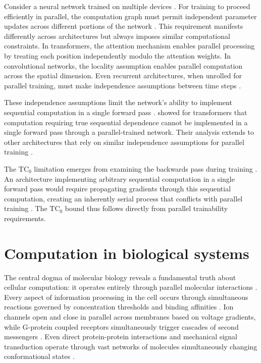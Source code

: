 \documentclass[12pt]{article}
\begin{document}
Consider a neural network trained on multiple devices \cite{zhao2024epha}.
For training to proceed efficiently in parallel, the computation graph must permit independent parameter updates across different portions of the network \cite{barrett2019analyzing}.
This requirement manifests differently across architectures but always imposes similar computational constraints.
In transformers, the attention mechanism enables parallel processing by treating each position independently modulo the attention weights.
In convolutional networks, the locality assumption enables parallel computation across the spatial dimension.
Even recurrent architectures, when unrolled for parallel training, must make independence assumptions between time steps \cite{dickson2023rnns}.

These independence assumptions limit the network's ability to implement sequential computation in a single forward pass \cite{wei2022chain}.
\cite{merrill2023parallelism} showed for transformers that computation requiring true sequential dependence cannot be implemented in a single forward pass through a parallel-trained network.
Their analysis extends to other architectures that rely on similar independence assumptions for parallel training \cite{stillman2023generative}.

The $\text{TC}_0$ limitation emerges from examining the backwards pass during training \cite{jung2020new}.
An architecture implementing arbitrary sequential computation in a single forward pass would require propagating gradients through this sequential computation, creating an inherently serial process that conflicts with parallel training \cite{zhu2024overcoming}.
The $\text{TC}_0$ bound thus follows directly from parallel trainability requirements.

\section{Computation in biological systems}

The central dogma of molecular biology reveals a fundamental truth about cellular computation: it operates entirely through parallel molecular interactions \cite{wang2023parallel,cai2024efficient,fu2023scgrn}.
Every aspect of information processing in the cell occurs through simultaneous reactions governed by concentration thresholds and binding affinities \cite{alberts2022molecular}.
Ion channels open and close in parallel across membranes based on voltage gradients, while G-protein coupled receptors simultaneously trigger cascades of second messengers \cite{alberts2022molecular}.
Even direct protein-protein interactions and mechanical signal transduction operate through vast networks of molecules simultaneously changing conformational states \cite{alberts2022molecular,berridge2014cell}.
\end{document}
